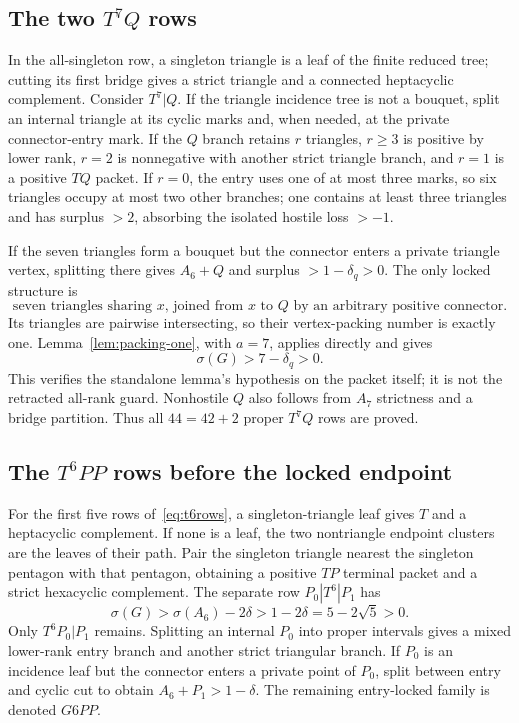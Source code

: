 \documentclass[11pt]{article}
\newcommand{\sig}{\sigma}
\begin{document}
\subsection{The two $T^7Q$ rows}

In the all-singleton row, a singleton triangle is a leaf of the finite reduced
tree; cutting its first bridge gives a strict triangle and a connected
heptacyclic complement.  Consider $T^7|Q$.  If the triangle incidence tree is
not a bouquet, split an internal triangle at its cyclic marks and, when needed,
at the private connector-entry mark.  If the $Q$ branch retains $r$ triangles,
$r\geq3$ is positive by lower rank, $r=2$ is nonnegative with another strict
triangle branch, and $r=1$ is a positive $TQ$ packet.  If $r=0$, the entry uses
one of at most three marks, so six triangles occupy at most two other branches;
one contains at least three triangles and has surplus $>2$, absorbing the
isolated hostile loss $>-1$.

If the seven triangles form a bouquet but the connector enters a private
triangle vertex, splitting there gives $A_6+Q$ and surplus
$>1-\delta_q>0$.  The only locked structure is
\begin{equation}\label{eq:g7q}
 \text{seven triangles sharing $x$, joined from $x$ to $Q$ by an arbitrary
 positive connector.}
\end{equation}
Its triangles are pairwise intersecting, so their vertex-packing number is
exactly one.  Lemma~\ref{lem:packing-one}, with $a=7$, applies directly and
gives
\[
 \sig(G)>7-\delta_q>0.
\]
This verifies the standalone lemma's hypothesis on the packet itself; it is
not the retracted all-rank guard.  Nonhostile $Q$ also follows from
$A_7$ strictness and a bridge partition.  Thus all $44=42+2$ proper $T^7Q$
rows are proved.

\subsection{The $T^6PP$ rows before the locked endpoint}

For the first five rows of~\eqref{eq:t6rows}, a singleton-triangle leaf gives
$T$ and a heptacyclic complement.  If none is a leaf, the two nontriangle
endpoint clusters are the leaves of their path.  Pair the singleton triangle
nearest the singleton pentagon with that pentagon, obtaining a positive $TP$
terminal packet and a strict hexacyclic complement.  The separate row
$P_0|T^6|P_1$ has
\[
 \sig(G)>\sig(A_6)-2\delta>1-2\delta=5-2\sqrt5>0.
\]
Only $T^6P_0|P_1$ remains.  Splitting an internal $P_0$ into proper intervals
gives a mixed lower-rank entry branch and another strict triangular branch.  If
$P_0$ is an incidence leaf but the connector enters a private point of $P_0$,
split between entry and cyclic cut to obtain $A_6+P_1>1-\delta$.  The remaining
entry-locked family is denoted $G6PP$.
\end{document}
